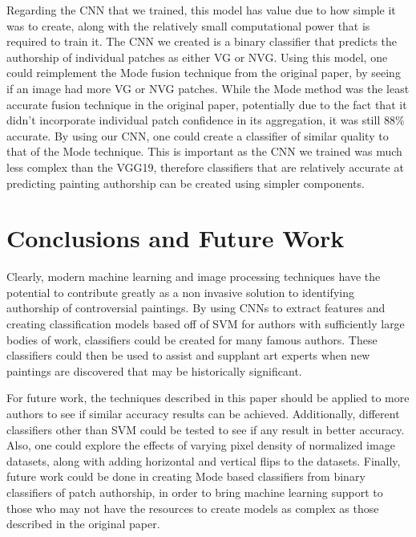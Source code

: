 \documentclass{article}
\begin{document}
Regarding the CNN that we trained, this model has value due to how simple it was to create, along with the relatively small computational power that is required to train it. The CNN we created is a binary classifier that predicts the authorship of individual patches as either VG or NVG. Using this model, one could reimplement the Mode fusion technique from the original paper, by seeing if an image had more VG or NVG patches. While the Mode method was the least accurate fusion technique in the original paper, potentially due to the fact that it didn't incorporate individual patch confidence in its aggregation, it was still 88\% accurate. By using our CNN, one could create a classifier of similar quality to that of the Mode technique. This is important as the CNN we trained was much less complex than the VGG19, therefore classifiers that are relatively accurate at predicting painting authorship can be created using simpler components. 






\section{Conclusions and Future Work}

Clearly, modern machine learning and image processing techniques have the potential to contribute greatly as a non invasive solution to identifying authorship of controversial paintings. By using CNNs to extract features and creating classification models based off of SVM for authors with sufficiently large bodies of work, classifiers could be created for many famous authors. These classifiers could then be used to assist and supplant art experts when new paintings are discovered that may be historically significant. 

For future work, the techniques described in this paper should be applied to more authors to see if similar accuracy results can be achieved. Additionally, different classifiers other than SVM could be tested to see if any result in better accuracy. Also, one could explore the effects of varying pixel density of normalized image datasets, along with adding horizontal and vertical flips to the datasets. Finally, future work could be done in creating Mode based classifiers from binary classifiers of patch authorship, in order to bring machine learning support to those who may not have the resources to create models as complex as those described in the original paper. 
\end{document}
